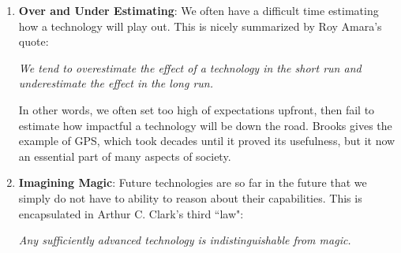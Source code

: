 \begin{enumerate}
	\item \textbf{Over and Under Estimating}: We often have a difficult time estimating how a technology will play out. This is nicely summarized by Roy Amara's quote:
	
	\textit{We tend to overestimate the effect of a technology in the short run and underestimate the effect in the long run.}
	
	In other words, we often set too high of expectations upfront, then fail to estimate how impactful a technology will be down the road. Brooks gives the example of GPS, which took decades until it proved its usefulness, but it now an essential part of many aspects of society. 
	\item \textbf{Imagining Magic}: Future technologies are so far in the future that we simply do not have to ability to reason about their capabilities. This is encapsulated in Arthur C. Clark's third ``law":
	
	\textit{Any sufficiently advanced technology is indistinguishable from magic.}
	

\end{enumerate}
